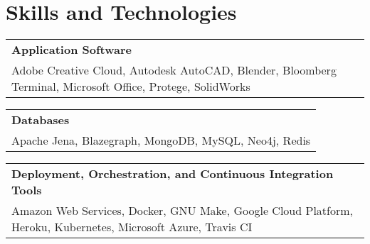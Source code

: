\documentclass[10pt]{article}
\newcommand{\tabularxwidth}{\textwidth}
\begin{document}
        

    



    
        \section{Skills and Technologies}

    
        \begin{tabularx}{\tabularxwidth}{X}
            \textbf{Application Software} \\
            
    
            Adobe Creative Cloud, 
            Autodesk AutoCAD, 
            Blender, 
            Bloomberg Terminal, 
            Microsoft Office, 
            Protege, 
            SolidWorks \\
        \end{tabularx}

        
            \vspace{.5em}
        

    
        \begin{tabularx}{\tabularxwidth}{X}
            \textbf{Databases} \\
            
    
            Apache Jena, 
            Blazegraph, 
            MongoDB, 
            MySQL, 
            Neo4j, 
            Redis \\
        \end{tabularx}

        
            \vspace{.5em}
        

    
        \begin{tabularx}{\tabularxwidth}{X}
            \textbf{Deployment, Orchestration, and Continuous Integration Tools} \\
            
    
            Amazon Web Services, 
            Docker, 
            GNU Make, 
            Google Cloud Platform, 
            Heroku, 
            Kubernetes, 
            Microsoft Azure, 
            Travis CI \\
        \end{tabularx}
\end{document}
